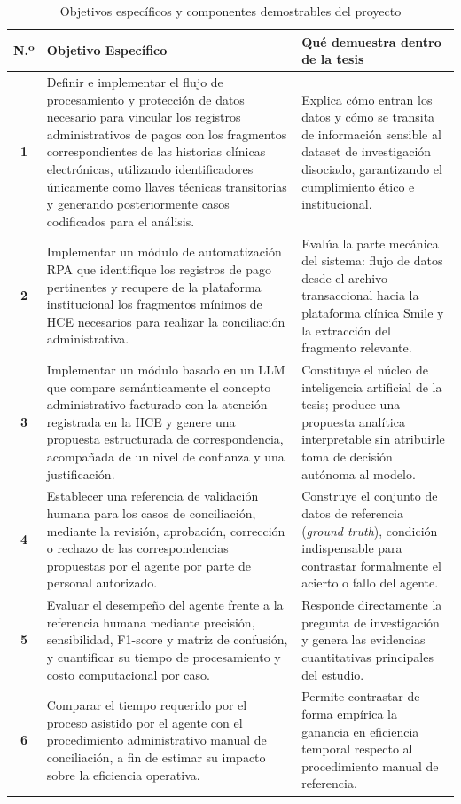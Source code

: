 \begin{table}[h!]
\centering
\small
\begin{tabular}{|c|p{7.3cm}|p{5.5cm}|}
\hline
\textbf{N.º} & \textbf{Objetivo Específico} & \textbf{Qué demuestra dentro de la tesis} \\ \hline
\textbf{1} & Definir e implementar el flujo de procesamiento y protección de datos necesario para vincular los registros administrativos de pagos con los fragmentos correspondientes de las historias clínicas electrónicas, utilizando identificadores únicamente como llaves técnicas transitorias y generando posteriormente casos codificados para el análisis. & Explica cómo entran los datos y cómo se transita de información sensible al dataset de investigación disociado, garantizando el cumplimiento ético e institucional. \\ \hline
\textbf{2} & Implementar un módulo de automatización RPA que identifique los registros de pago pertinentes y recupere de la plataforma institucional los fragmentos mínimos de HCE necesarios para realizar la conciliación administrativa. & Evalúa la parte mecánica del sistema: flujo de datos desde el archivo transaccional hacia la plataforma clínica Smile y la extracción del fragmento relevante. \\ \hline
\textbf{3} & Implementar un módulo basado en un LLM que compare semánticamente el concepto administrativo facturado con la atención registrada en la HCE y genere una propuesta estructurada de correspondencia, acompañada de un nivel de confianza y una justificación. & Constituye el núcleo de inteligencia artificial de la tesis; produce una propuesta analítica interpretable sin atribuirle toma de decisión autónoma al modelo. \\ \hline
\textbf{4} & Establecer una referencia de validación humana para los casos de conciliación, mediante la revisión, aprobación, corrección o rechazo de las correspondencias propuestas por el agente por parte de personal autorizado. & Construye el conjunto de datos de referencia (\textit{ground truth}), condición indispensable para contrastar formalmente el acierto o fallo del agente. \\ \hline
\textbf{5} & Evaluar el desempeño del agente frente a la referencia humana mediante precisión, sensibilidad, F1-score y matriz de confusión, y cuantificar su tiempo de procesamiento y costo computacional por caso. & Responde directamente la pregunta de investigación y genera las evidencias cuantitativas principales del estudio. \\ \hline
\textbf{6} & Comparar el tiempo requerido por el proceso asistido por el agente con el procedimiento administrativo manual de conciliación, a fin de estimar su impacto sobre la eficiencia operativa. & Permite contrastar de forma empírica la ganancia en eficiencia temporal respecto al procedimiento manual de referencia. \\ \hline
\end{tabular}
\caption{Objetivos específicos y componentes demostrables del proyecto}
\label{tab:objetivos_especificos}
\end{table}

